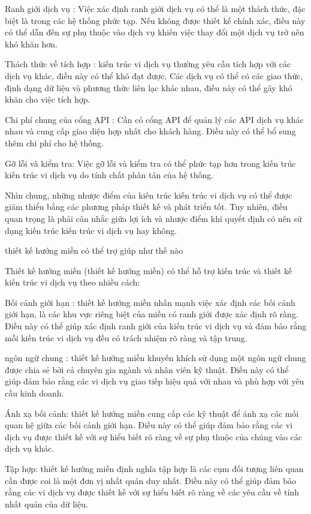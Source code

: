 Ranh giới dịch vụ : Việc xác định ranh giới dịch vụ có thể là một thách thức, đặc biệt là trong các hệ thống phức tạp. Nếu không được thiết kế chính xác, điều này có thể dẫn đến sự phụ thuộc vào dịch vụ khiến việc thay đổi một dịch vụ trở nên khó khăn hơn.

Thách thức về tích hợp : kiến trúc vi dịch vụ thường yêu cầu tích hợp với các dịch vụ khác, điều này có thể khó đạt được. Các dịch vụ có thể có các giao thức, định dạng dữ liệu và phương thức liên lạc khác nhau, điều này có thể gây khó khăn cho việc tích hợp.

Chi phí chung của cổng API : Cần có cổng API để quản lý các API dịch vụ khác nhau và cung cấp giao diện hợp nhất cho khách hàng. Điều này có thể bổ sung thêm chi phí cho hệ thống.

Gỡ lỗi và kiểm tra: Việc gỡ lỗi và kiểm tra có thể phức tạp hơn trong kiến trúc kiến trúc vi dịch vụ do tính chất phân tán của hệ thống.

Nhìn chung, những nhược điểm của kiến trúc kiến trúc vi dịch vụ có thể được giảm thiểu bằng các phương pháp thiết kế và phát triển tốt. Tuy nhiên, điều quan trọng là phải cân nhắc giữa lợi ích và nhược điểm khi quyết định có nên sử dụng kiến trúc kiến trúc vi dịch vụ hay không.

thiết kế hướng miền có thể trợ giúp như thế nào

Thiết kế hướng miền (thiết kế hướng miền) có thể hỗ trợ kiến trúc và thiết kế kiến trúc vi dịch vụ theo nhiều cách:

Bối cảnh giới hạn : thiết kế hướng miền nhấn mạnh việc xác định các bối cảnh giới hạn, là các khu vực riêng biệt của miền có ranh giới được xác định rõ ràng. Điều này có thể giúp xác định ranh giới của kiến trúc vi dịch vụ và đảm bảo rằng mỗi kiến trúc vi dịch vụ đều có trách nhiệm rõ ràng và tập trung.

ngôn ngữ chung : thiết kế hướng miền khuyến khích sử dụng một ngôn ngữ chung được chia sẻ bởi cả chuyên gia ngành và nhân viên kỹ thuật. Điều này có thể giúp đảm bảo rằng các vi dịch vụ giao tiếp hiệu quả với nhau và phù hợp với yêu cầu kinh doanh.

Ánh xạ bối cảnh: thiết kế hướng miền cung cấp các kỹ thuật để ánh xạ các mối quan hệ giữa các bối cảnh giới hạn. Điều này có thể giúp đảm bảo rằng các vi dịch vụ được thiết kế với sự hiểu biết rõ ràng về sự phụ thuộc của chúng vào các dịch vụ khác.

Tập hợp: thiết kế hướng miền định nghĩa tập hợp là các cụm đối tượng liên quan cần được coi là một đơn vị nhất quán duy nhất. Điều này có thể giúp đảm bảo rằng các vi dịch vụ được thiết kế với sự hiểu biết rõ ràng về các yêu cầu về tính nhất quán của dữ liệu.

